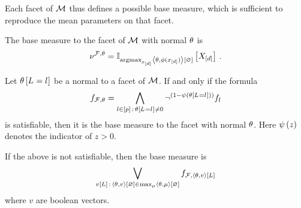 Each facet of $\mathcal{M}$ thus defines a possible base measure, which is sufficient to reproduce the mean parameters on that facet.

\begin{definition}
	The base measure to the facet of $\mathcal{M}$ with normal $\theta$ is
		\[ \nu^{\mathcal{F},\theta} = \mathbb{I}_{\mathrm{argmax}_{x_{[d]}} \left\langle \theta,\phi(x_{[d]})\right\rangle \left[ \varnothing \right]}\left[X_{[d]}\right] \, . \]
\end{definition}


\begin{lemma}
	Let $\theta\left[L_{}=l_{}\right]$ be a normal to a facet of $\mathcal{M}$.
	If and only if the formula
		\[ f_{\mathcal{F},\theta} = \bigwedge_{l\in[p] \, : \, \theta\left[L_{}=l_{}\right]\neq0} \lnot^{(1-\psi\left(\theta\left[L_{}=l_{}\right]\right))} f_{l}  \]
	is satisfiable, then it is the base measure to the facet with normal $\theta$.
	Here $\psi\left(z\right)$ denotes the indicator of $z>0$.
	
	If the above is not satisfiable, then the base measure is
		\[ \bigvee_{v[L] \, : \, \left\langle \theta,v\right\rangle \left[ \varnothing \right] \in \max_{\mu} \left\langle \theta,\mu\right\rangle \left[ \varnothing \right] }  f_{\mathcal{F},\left\langle \theta,v\right\rangle \left[ L \right]}  \]
	where $v$ are boolean vectors.
\end{lemma}
